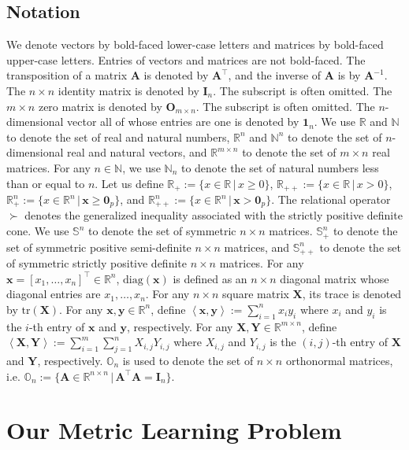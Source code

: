 \documentclass[10pt,onecolumn]{article}
\theoremstyle{definition}
\theoremstyle{definition}
\theoremstyle{definition}
\theoremstyle{definition}
\theoremstyle{definition}
\theoremstyle{theorem}
\newcommand{\0}{{\bm{0}}}
\newcommand{\1}{{\bm{1}}}
\newcommand{\x}{{\bm{x}}}
\newcommand{\y}{{\bm{y}}}
\newcommand{\vA}{{\bm{A}}}
\newcommand{\vI}{{\bm{I}}}
\newcommand{\bN}{{\mathbb{N}}}
\newcommand{\bO}{{\mathbb{O}}}
\newcommand{\vO}{{\bm{O}}}
\newcommand{\bR}{{\mathbb{R}}}
\newcommand{\bS}{{\mathbb{S}}}
\newcommand{\X}{{\bm{X}}}
\newcommand{\Y}{{\bm{Y}}}
\begin{document}
\subsection{Notation}
We denote vectors by bold-faced lower-case letters and
matrices by bold-faced upper-case letters.
Entries of vectors and matrices are not bold-faced.
The transposition of a matrix $\vA$ is denoted by $\vA^{\top}$,
and the inverse of $\vA$ is by $\vA^{-1}$.
The $n\times n$ identity matrix is denoted by $\vI_{n}$.
The subscript is often omitted.
The $m\times n$ zero matrix is denoted by $\vO_{m\times n}$.
The subscript is often omitted.
The $n$-dimensional vector all of whose entries are one is denoted by $\1_{n}$.
We use $\bR$ and $\bN$ to denote the set of real and natural numbers,
$\bR^{n}$ and $\bN^{n}$ to denote the set of $n$-dimensional real and natural vectors,
and $\bR^{m\times n}$ to denote the set of $m\times n$ real matrices.
For any $n\in\bN$, we use $\bN_{n}$ to denote the set of natural numbers less than or equal to $n$.
Let us define
$\bR_{+}:=\{ x\in\bR \,|\, x\ge 0 \}$,
$\bR_{++}:=\{ x\in\bR \,|\, x> 0 \}$,
$\bR_{+}^{n}:=\{ x\in\bR^{n} \,|\, \x\ge \0_{p} \}$, and
$\bR_{++}^{n}:=\{ x\in\bR^{n} \,|\, \x> \0_{p} \}$.
The relational operator $\succ$ denotes the generalized inequality
associated with the strictly positive definite cone.
We use
$\bS^{n}$ to denote the set of symmetric $n\times n$ matrices.
$\bS_{+}^{n}$ to denote the set of symmetric positive semi-definite $n\times n$ matrices,
and
$\bS_{++}^{n}$ to denote the set of symmetric strictly positive definite $n\times n$ matrices.
For any $\x = \left[x_{1},\dots,x_{n}\right]^\top\in\bR^{n}$,
$\text{diag}(\x)$ is defined as an $n\times n$
diagonal matrix whose diagonal entries are
$x_{1},\dots,x_{n}$.
For any $n\times n$ square matrix $\X$, its trace is denoted by
$\text{tr}(\X)$.
For any $\x,\y\in\bR^{n}$, define $\left<\x,\y\right> := \sum_{i=1}^{n}x_{i}y_{i}$
where $x_{i}$ and $y_{i}$ is the $i$-th entry of $\x$ and $\y$, respectively.
For any $\X,\Y\in\bR^{m\times n}$,
define $\left<\X,\Y\right> := \sum_{i=1}^{m}\sum_{j=1}^{n}X_{i,j}Y_{i,j}$
where $X_{i,j}$ and $Y_{i,j}$ is the $(i,j)$-th entry of $\X$ and $\Y$, respectively.
$\bO_{n}$ is used to denote the set of $n\times n$ orthonormal
matrices, i.e.
$\bO_{n} := \{\vA \in\bR^{n\times n} \,|\, \vA^\top \vA = \vI_{n}\}.$
\section{Our Metric Learning Problem}
\end{document}
